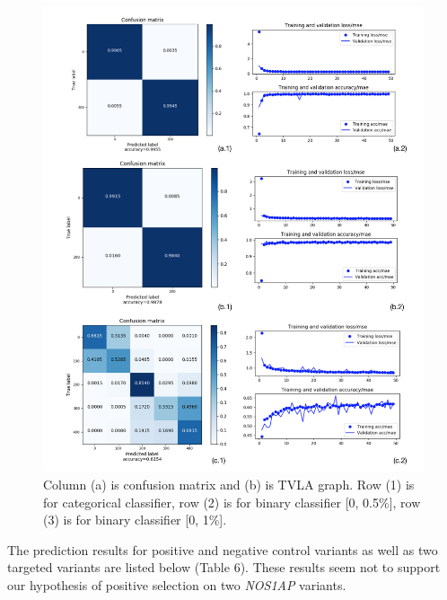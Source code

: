 \documentclass[a4paper,12pt,oneside]{extarticle}
\begin{document}
\begin{figure}[H] 
  \captionsetup{singlelinecheck = false, justification=justified}
  \centering
  \includegraphics[trim = 0 5mm 0 5mm, clip,width=1\textwidth]{figure6.png}
  \caption{Column (a) is confusion matrix and (b) is TVLA graph. Row (1) is for categorical classifier, row (2) is for binary classifier [0, 0.5\%], row (3) is for binary classifier [0, 1\%].
}
\end{figure}

The prediction results for positive and negative control variants as well as two targeted variants are listed below (Table 6). These results seem not to support our hypothesis of positive selection on two \textit{NOS1AP} variants.
\end{document}
